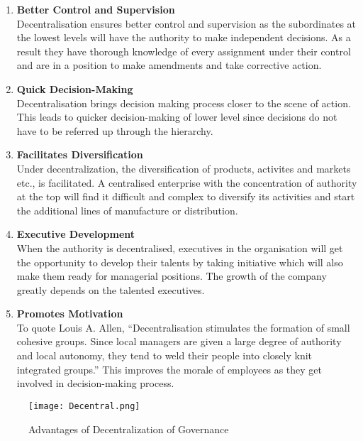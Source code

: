 \begin{enumerate}

\item \textbf{Better Control and Supervision} \\
Decentralisation ensures better control and supervision as the subordinates at the lowest levels will have the authority to make independent decisions. As a result they have thorough knowledge of every assignment under their control and are in a position to make amendments and take corrective action.

\item \textbf{Quick Decision-Making} \\
Decentralisation brings decision making process closer to the scene of action. This leads to quicker decision-making of lower level since decisions do not have to be referred up through the hierarchy.

\item \textbf{Facilitates Diversification}\\
Under decentralization, the diversification of products, activites and markets etc., is facilitated. A centralised enterprise with the concentration of authority at the top will find it difficult and complex to diversify its activities and start the additional lines of manufacture or distribution.

\item \textbf{Executive Development}\\
When the authority is decentralised, executives in the organisation will get the opportunity to develop their talents by taking initiative which will also make them ready for managerial positions. The growth of the company greatly depends on the talented executives.

\item \textbf{Promotes Motivation}\\
To quote Louis A. Allen, “Decentralisation stimulates the formation of small cohesive groups. Since local managers are given a large degree of authority and local autonomy, they tend to weld their people into closely knit integrated groups.” This improves the morale of employees as they get involved in decision-making process.

\end{enumerate}

\begin{figure}[H]
    \centering
	\texttt{[image: Decentral.png]}
    \caption{ Advantages of Decentralization of Governance }
    \label{fig:Advantages of Decentralization of Governance}
\end{figure}

